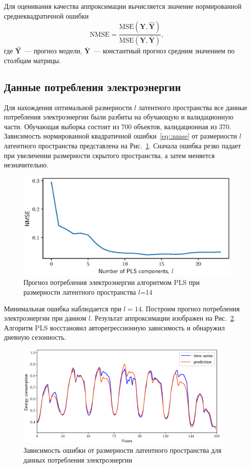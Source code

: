 \documentclass[12pt,twoside]{article}
\newcommand{\bY}{\mathbf{Y}}
\begin{document}
Для оценивания качества аппроксимации вычисляется значение нормированной среднеквадратичной ошибки
\begin{equation}
\text{NMSE} = \frac{\text{MSE} (\bY, \mathbf{\hat{Y}})}{\text{MSE} (\bY, \mathbf{\bar{Y}})},
\label{eq::nmse}
\end{equation}
где $\mathbf{\hat{Y}}$~--- прогноз модели, $\mathbf{\bar{Y}}$~--- константный прогноз средним значением по столбцам матрицы.

\subsection{Данные потребления электроэнергии}

Для нахождения оптимальной размерности $l$ латентного пространства все данные потребления электроэнергии были разбиты на обучающую и валидационную части. 
Обучающая выборка состоит из $700$ объектов, валидационная из $370$. Зависимость нормированной квадратичной ошибки~\eqref{eq::nmse} от размерности $l$ латентного пространства представлена на Рис.~\ref{fig::energy_n_comp}. 
Сначала ошибка резко падает при увеличении размерности скрытого пространства, а затем меняется незначительно.

\begin{figure}[!h]
	\centering
	\includegraphics[width=0.75\linewidth]{figs/energy_n_comp}
	\caption{Прогноз потребления электроэнергии алгоритмом PLS при размерности латентного пространства $l$=14}
	\label{fig::energy_n_comp}
\end{figure}

Минимальная ошибка наблюдается при $l=14$. 
Построим прогноз потребления электроэнергии при данном $l$. 
Результат аппроксимации изображен на Рис.~\ref{fig::energy_prediction}. Алгоритм PLS восстановил авторегрессионную зависимость и обнаружил дневную сезонность.

\begin{figure}[!h]
	\centering
	\includegraphics[width=0.95\textwidth]{figs/energy_prediction}
	\caption{Зависимость ошибки от размерности латентного пространства для данных потребления электроэнергии}
	\label{fig::energy_prediction}
\end{figure}
\end{document}
